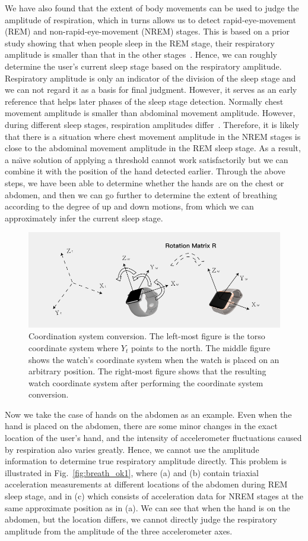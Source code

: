 We have also found that the extent of body movements can be used to judge the amplitude of respiration, which in turns allows us to detect
rapid-eye-movement (REM) and non-rapid-eye-movement (NREM) stages. This is based on a prior study showing that when people sleep in the REM
stage, their respiratory amplitude is smaller than that in the other stages~\cite{respiratory1982}. Hence, we can roughly determine the
user's current sleep stage based on the respiratory amplitude. Respiratory amplitude is only an indicator of the division of the sleep
stage and we can not regard it as a basis for final judgment. {However, it serves as an early reference that helps later phases of the
sleep stage detection. Normally chest movement amplitude is smaller than abdominal movement amplitude. However, during different sleep
stages, respiration amplitudes differ~\cite{respiratory}. Therefore, it is likely that there is a situation where chest movement amplitude
in the NREM stages is close to the abdominal movement amplitude in the REM sleep stage. As a result, a na\"{\i}ve solution of applying a
threshold cannot work satisfactorily but we can combine it with the position of the hand detected earlier. Through the above steps, we have
been able to determine whether the hands are on the chest or abdomen, and then we can go further to determine the extent of breathing
according to the degree of up and down motions, from which we can approximately infer the current sleep stage}.
\begin{figure}[!t]
\centering
      \includegraphics[width=0.67\linewidth]{Figures/watch.pdf}
  \caption{Coordination system conversion. The left-most figure is the torso coordinate system where $Y_t$ points to the north.
  The middle figure shows the watch's coordinate system when the watch is placed on an arbitrary position.
  The right-most figure shows that the resulting watch coordinate system after performing the coordinate system conversion.}\label{fig:watch}
\end{figure}

 Now we take the case of hands on the abdomen as an example. Even when the hand is placed on the abdomen, there are
some minor changes in the exact location of the user's hand, and the intensity of accelerometer fluctuations caused by respiration also
varies greatly. Hence, we cannot use the amplitude information to determine true respiratory amplitude directly. This problem is
illustrated in Fig.~\ref{fig:breath_ok1}, where (a) and (b) contain triaxial acceleration measurements at different locations of the
abdomen during REM sleep stage, and in (c) which consists of acceleration data for NREM stages at the same approximate position as in (a).
{We can see that when the hand is on the abdomen, but the location differs, we cannot directly judge the respiratory amplitude from the
amplitude of the three accelerometer axes.}

